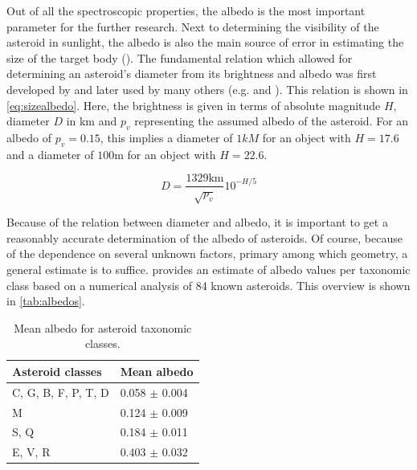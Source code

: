Out of all the spectroscopic properties, the albedo is the most important parameter for the further research. Next to determining the visibility of the asteroid in sunlight, the albedo is also the main source of error in estimating the size of the target body (\cite{quantifyingrisk}). The fundamental relation which allowed for determining an asteroid's diameter from its brightness and albedo was first developed by \cite{sizealbedo} and later used by many others (e.g. \cite{populationofnea} and \cite{quantifyingrisk}). This relation is shown in \autoref{eq:sizealbedo}. Here, the brightness is given in terms of absolute magnitude $H$, diameter $D$ in km and $p_v$ representing the assumed albedo of the asteroid. For an albedo of $p_v=0.15$, this implies a diameter of $1kM$ for an object with $H=17.6$ and a diameter of $100$m for an object with $H=22.6$.

\begin{equation}
    D = \frac{1329 \mathrm{km}}{\sqrt{p_v}}10^{-H/5}
    \label{eq:sizealbedo}
\end{equation}

Because of the relation between diameter and albedo, it is important to get a reasonably accurate determination of the albedo of asteroids. Of course, because of the dependence on several unknown factors, primary among which geometry, a general estimate is to suffice. \cite{albedovalues} provides an estimate of albedo values per taxonomic class based on a numerical analysis of 84 known asteroids. This overview is shown in \autoref{tab:albedos}.\\

\begin{table}[htbp]
\centering
\caption{Mean albedo for asteroid taxonomic classes.}
\begin{tabular}{ll}
\label{tab:albedos}
\textbf{Asteroid classes} & \textbf{Mean albedo} \\ \hline \vspace{0.25cm}
C, G, B, F, P, T, D       & 0.058 $\pm$ 0.004       \\ \vspace{0.25cm}
M                         & 0.124 $\pm$ 0.009       \\ \vspace{0.25cm}
S, Q                      & 0.184 $\pm$ 0.011       \\ \vspace{0.25cm}
E, V, R                   & 0.403 $\pm$ 0.032      
\end{tabular}
\end{table}

